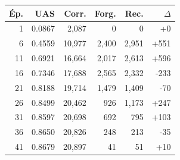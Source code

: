 \begin{table}[ht]
\hfill
\begin{minipage}[t]{0.42\linewidth}
\centering\tiny
\begin{tabular}{rrrrrr}
\toprule
\textbf{Ép.} & \textbf{UAS} & \textbf{Corr.} & \textbf{Forg.} & \textbf{Rec.} & \textbf{$\Delta$} \\
\midrule
1 & 0.0867 & 2,087 & 0 & 0 & +0 \\
6 & 0.4559 & 10,977 & 2,400 & 2,951 & +551 \\
11 & 0.6921 & 16,664 & 2,017 & 2,613 & +596 \\
16 & 0.7346 & 17,688 & 2,565 & 2,332 & -233 \\
21 & 0.8188 & 19,714 & 1,479 & 1,409 & -70 \\
26 & 0.8499 & 20,462 & 926 & 1,173 & +247 \\
31 & 0.8597 & 20,698 & 692 & 795 & +103 \\
36 & 0.8650 & 20,826 & 248 & 213 & -35 \\
41 & 0.8679 & 20,897 & 41 & 51 & +10 \\
\bottomrule
\end{tabular}
\end{minipage}
\end{table}
